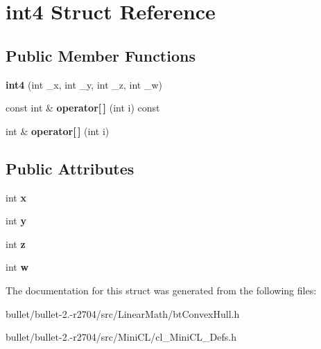 \hypertarget{classint4}{\section{int4 Struct Reference}
\label{classint4}
}
\subsection*{Public Member Functions}
\begin{DoxyCompactItemize}
\item 
\hypertarget{classint4_a6efde3846ba0a56c7846728bdf246d1b}{{\bfseries int4} (int \+\_\+x, int \+\_\+y, int \+\_\+z, int \+\_\+w)}\label{classint4_a6efde3846ba0a56c7846728bdf246d1b}

\item 
\hypertarget{classint4_aec8f5cc72571aa64b2471537208592a3}{const int \& {\bfseries operator\mbox{[}$\,$\mbox{]}} (int i) const }\label{classint4_aec8f5cc72571aa64b2471537208592a3}

\item 
\hypertarget{classint4_adbd1ea9ddcb011482aa4e1c6e58d34b1}{int \& {\bfseries operator\mbox{[}$\,$\mbox{]}} (int i)}\label{classint4_adbd1ea9ddcb011482aa4e1c6e58d34b1}

\end{DoxyCompactItemize}
\subsection*{Public Attributes}
\begin{DoxyCompactItemize}
\item 
\hypertarget{classint4_a5cf362aa802672cc8ef61fda401ea39f}{int {\bfseries x}}\label{classint4_a5cf362aa802672cc8ef61fda401ea39f}

\item 
\hypertarget{classint4_a7aa524da4f1f5a4615e958a009953495}{int {\bfseries y}}\label{classint4_a7aa524da4f1f5a4615e958a009953495}

\item 
\hypertarget{classint4_a95bb901cfcd69960cd3d609eef4c9c8c}{int {\bfseries z}}\label{classint4_a95bb901cfcd69960cd3d609eef4c9c8c}

\item 
\hypertarget{classint4_a5fcec5b3c04a5c1b6a5dc39e75d95975}{int {\bfseries w}}\label{classint4_a5fcec5b3c04a5c1b6a5dc39e75d95975}

\end{DoxyCompactItemize}


The documentation for this struct was generated from the following files\+:\begin{DoxyCompactItemize}
\item 
bullet/bullet-\/2.-\/r2704/src/\+Linear\+Math/bt\+Convex\+Hull.\+h\item 
bullet/bullet-\/2.-\/r2704/src/\+Mini\+C\+L/cl\+\_\+\+Mini\+C\+L\+\_\+\+Defs.\+h\end{DoxyCompactItemize}
